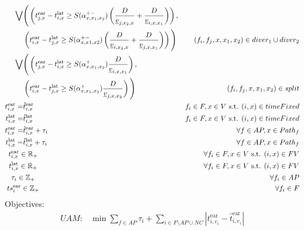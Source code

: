 \documentclass[../thesis.tex]{subfiles}
\begin{document}
\begin{align}
    \bigvee&
    \Bigg(\left(t^\text{ear}_{j,x}-t^\text{lat}_{i,x}\geq S(\alpha^{+-}_{x,x_1,x_2})\left(\frac D{\underline v_{j,x_2,x}} + \frac D{\underline v_{i,x,x_1}}\right)\right)
    ,\nonumber\\&\left(
    t^\text{ear}_{i,x}-t^\text{lat}_{j,x}\geq S(\alpha^{+-}_{x,x1,x2})\left(\frac D{\underline v_{i,x_2,x}}+\frac D{\underline v_{j,x,x_1}}\right)\right)\Bigg)
    & (f_i,f_j,x,x_1,x_2)\in diver_1\cup diver_2\\
    \bigvee&\Bigg(
    \left(
    t^\text{ear}_{j,x}-t^\text{lat}_{i,x}\geq S(\alpha^+_{x,x_1,x_2}) \frac D{\underline v_{i,x,x_1}}\right),
    \nonumber\\&\left(
    t^\text{ear}_{i,x}-t^\text{lat}_{j,x}\geq S(\alpha^+_{x,x_1,x_2})\frac D {\underline v_{j,x,x_2}}
    \right)\Bigg) & (f_i,f_j,x,x_1,x_2)\in split \\
    t^\text{ear}_{i,x} =& \hat t^\text{ear}_{i,x}& f_i\in F, x\in V\text { s.t. } (i,x)\in timeFixed\\
    t^\text{lat}_{i,x} =& \hat t^\text{lat}_{i,x}& f_i\in F, x\in V\text { s.t. } (i,x)\in timeFixed\\
    t^\text{ear}_{i,x} =& \hat t^\text{ear}_{i,x} + \tau_i &\forall f\in AP, x\in Path_f\\
    t^\text{lat}_{i,x} =& \hat t^\text{lat}_{i,x} + \tau_i &\forall f\in AP, x\in Path_f\\
    &\mathclap{t^\text{ear}_{i,x} \in \mathbb{R}_+}&\forall f_i\in F,x\in V\text{ s.t. } (i,x)\in FV \nonumber \\
    &\mathclap{t^\text{lat}_{i,x} \in \mathbb{R}_+}&\forall f_i\in F,x\in V\text{ s.t. } (i,x)\in FV \nonumber \\
    &\mathclap{\tau_i\in \mathbb{Z}_+} &\forall f_i\in AP\nonumber\\
    &\mathclap{ts^\text{ear}_i\in \mathbb{Z}_+} &\forall f_i\in F\nonumber
\end{align}
Objectives:
\begin{align}
    UAM:&\min \sum_{f\in AP} \tau_i + \sum_{i\in F\setminus{AP\cup NC}} |t^\text{ear}_{i,e_{i}}-\hat t^\text{ear}_{i,e_{i}}|
\end{align}
\end{document}
